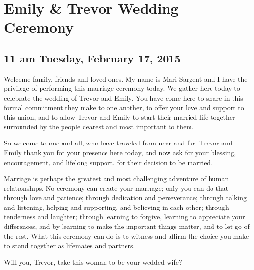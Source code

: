 \documentclass[12pt]{article}
\begin{document}
\section*{Emily \& Trevor Wedding Ceremony}

\subsection*{11 am Tuesday, February 17, 2015}

Welcome family, friends and loved ones. My name is Mari Sargent and I
have the privilege of performing this marriage ceremony today. We
gather here today to celebrate the wedding of Trevor and Emily. You
have come here to share in this formal commitment they make to one
another, to offer your love and support to this union, and to allow
Trevor and Emily to start their married life together surrounded by
the people dearest and most important to them. \par

So welcome to one and all, who have traveled from near and far. Trevor
and Emily thank you for your presence here today, and now ask for your
blessing, encouragement, and lifelong support, for their decision to
be married.

Marriage is perhaps the greatest and most challenging adventure of
human relationships. No ceremony can create your marriage; only you
can do that --- through love and patience; through dedication and
perseverance; through talking and listening, helping and supporting,
and believing in each other; through tenderness and laughter; through
learning to forgive, learning to appreciate your differences, and by
learning to make the important things matter, and to let go of the
rest. What this ceremony can do is to witness and affirm the choice
you make to stand together as lifemates and partners.

Will you, Trevor, take this woman to be your wedded wife? \par
\end{document}
